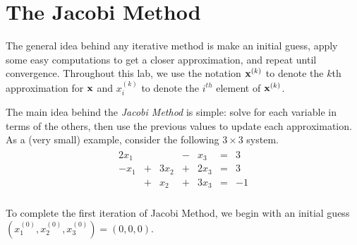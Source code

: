 \label{lab:iter_methods}





\section*{The Jacobi Method} %

The general idea behind any iterative method is make an initial guess, apply some easy computations to get a closer approximation, and repeat until convergence.
Throughout this lab, we use the notation $\mathbf{x}^{(k)}$ to denote the $k$th approximation for $\mathbf{x}$ and $x^{(k)}_i$ to denote the $i^{th}$ element of $\mathbf{x}^{(k)}$.

The main idea behind the \emph{Jacobi Method} is simple: solve for each variable in terms of the others, then use the previous values to update each approximation.
As a (very small) example, consider the following $3 \times 3$ system.
\begin{align*}
\begin{array}{ccccccc}
  2x_1 &   &      & - & x_3  & = & 3  \\
  -x_1 & + & 3x_2 & + & 2x_3 & = & 3  \\
       & + & x_2  & + & 3x_3 & = & -1 \\
\end{array}
\end{align*}

To complete the first iteration of Jacobi Method, we begin with an initial guess
$(x^{(0)}_1, x^{(0)}_2, x^{(0)}_3) = (0,0,0)$.

